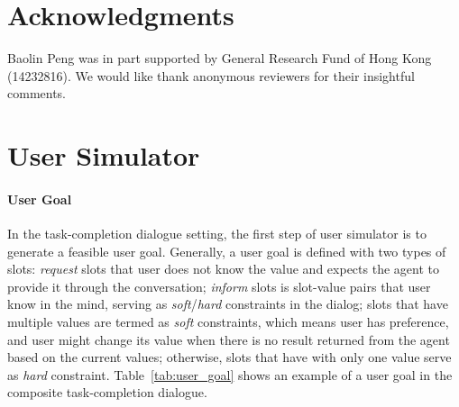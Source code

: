 \documentclass[11pt,letterpaper]{article}
\begin{document}
\section*{Acknowledgments}
Baolin Peng was in part supported by General Research Fund of Hong Kong (14232816). We would like thank anonymous reviewers for their insightful comments.





\newpage
\appendix

\section{User Simulator}
\label{app:appendix_us}
\paragraph{User Goal} In the task-completion dialogue setting, the first step of user simulator is to generate a feasible user goal. Generally, a user goal is defined with two types of slots: \emph{request} slots that user does not know the value and expects the agent to provide it through the conversation; \emph{inform} slots is slot-value pairs that user know in the mind, serving as \emph{soft}/\emph{hard} constraints in the dialog; slots that have multiple values are termed as \emph{soft} constraints, which means user has preference, and user might change its value when there is no result returned from the agent based on the current values; otherwise, slots that have with only one value serve as \emph{hard} constraint. Table~\ref{tab:user_goal} shows an example of a user goal in the composite task-completion dialogue.
\end{document}
